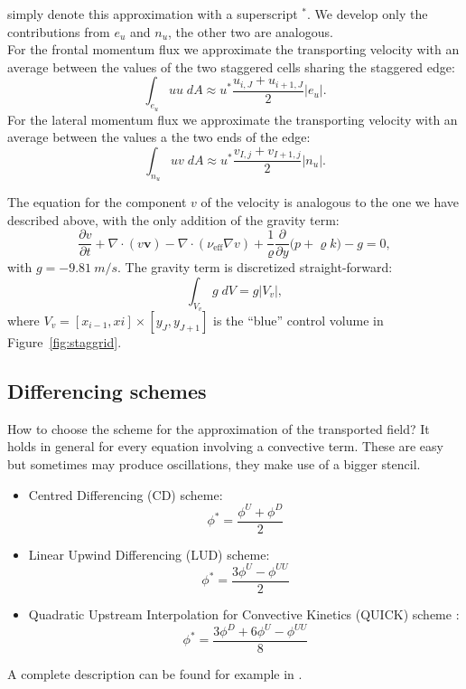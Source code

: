 \begin{itemize}
	simply denote this approximation with a superscript $^*$.
	We develop only the contributions from $e_u$ and $n_u$, the other two are 
	analogous.\\
	For the frontal momentum flux we approximate the transporting velocity with 
	an average between the values of the two staggered cells sharing the 
	staggered edge:
	\begin{equation}
		\int_{e_u} u u \; dA \approx u^* \frac{u_{i,J} + 
		u_{i+1,J}}{2}|e_u|.
	\end{equation}
	For the lateral momentum flux we approximate the transporting velocity with 
	an average between the values a the two ends of the edge:
	\begin{equation}
	\int_{n_u} u v \; dA \approx u^* \frac{v_{I,j} 
	+v_{I+1,j}}{2} |n_u|.
	\end{equation}
\end{itemize}

The equation for the component $v$ of the velocity is analogous to the one we 
have described above, with the only addition of the gravity term:
\begin{equation}
\frac{\partial v}{\partial t} + \nabla \cdot (v \mathbf{v}) - \nabla \cdot 
(\nu_\text{eff} \nabla v) + \frac{1}{\varrho}\frac{\partial}{\partial y} \big(p 
+ \varrho k\big) - g= 0,
\end{equation}
with $g = \SI{-9.81}{m/s}$. The gravity term is discretized straight-forward:
\begin{equation}
\int_{V_v} g \; dV = g |V_v|,
\end{equation}
where $V_v = [x_{i-1}, xi] \times [y_J, y_{J+1}]$ is the ``blue'' control 
volume in 
Figure~\ref{fig:staggrid}. 

%
\subsection{Differencing schemes} \label{subsec:diffscheme} %
How to choose the scheme for the approximation of the transported field?
It holds in general for every equation involving a convective term.
These are easy but sometimes may produce oscillations, they make use of a 
bigger stencil.
\begin{itemize}
\item Centred Differencing (CD) scheme:
\begin{equation} \label{eq:cd}
\phi^* = \frac{\phi^U + \phi^D}{2}
\end{equation}
\item Linear Upwind Differencing (LUD) scheme:
\begin{equation} \label{eq:lud}
\phi^* = \frac{3\phi^U - \phi^{UU}}{2}
\end{equation}
\item Quadratic Upstream Interpolation for Convective Kinetics (QUICK) scheme 
\cite{fv:leonard}:
\begin{equation} \label{eq:quick}
	\phi^* = \frac{3\phi^D + 6 \phi^U - \phi^{UU}}{8}
\end{equation}
\end{itemize}
A complete description can be found for example in \cite{main:vermal}.

